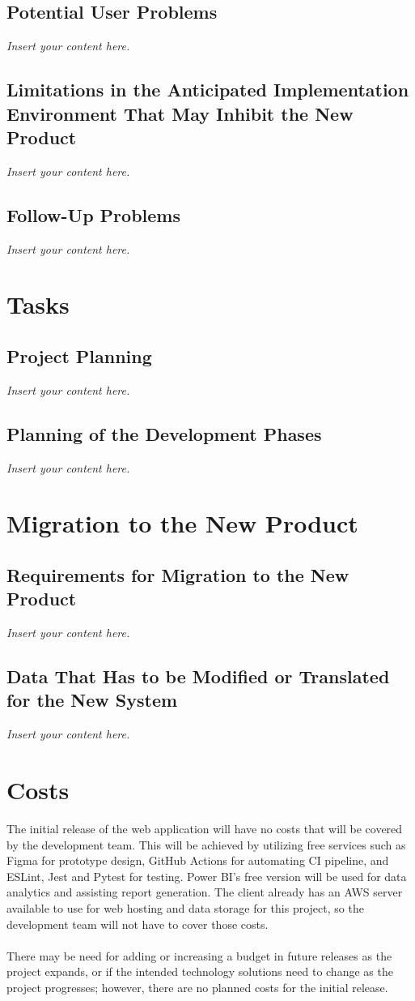 \documentclass[12pt]{article}
\newcommand{\lips}{\textit{Insert your content here.}}
\begin{document}
\subsection{Potential User Problems}
\lips
\subsection{Limitations in the Anticipated Implementation Environment That May
Inhibit the New Product}
\lips
\subsection{Follow-Up Problems}
\lips

\section{Tasks}
\subsection{Project Planning}
\lips
\subsection{Planning of the Development Phases}
\lips

\section{Migration to the New Product}
\subsection{Requirements for Migration to the New Product}
\lips
\subsection{Data That Has to be Modified or Translated for the New System}
\lips

\section{Costs}
\hspace{1.5em}The initial release of the web application will have no costs that will be covered by the development team. 
This will be achieved by utilizing free services such as Figma for prototype design, GitHub Actions for automating CI pipeline, and ESLint, Jest and Pytest 
for testing. Power BI's free version will be used for data analytics and assisting report generation. The client already has an AWS 
server available to use for web hosting and data storage for this project, so the development team will not have to cover those costs.
\\\\
\indent There may be need for adding or increasing a budget in future releases as the project expands, or if the intended
technology solutions need to change as the project progresses; however, there are no planned costs for the initial release.
\end{document}
